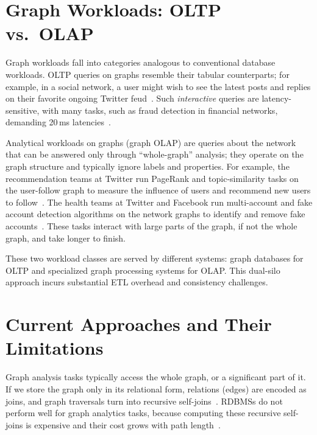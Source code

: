 \section{Graph Workloads: OLTP vs.\ OLAP}
\label{sec:intro:workloads}

Graph workloads fall into categories analogous to conventional database workloads.
\ac{OLTP} queries on graphs resemble their tabular counterparts; for example, in a social network, a user might wish to see the latest posts and replies on their favorite ongoing Twitter feud~\cite{AholeMusk:online}.
Such \emph{interactive} queries are latency-sensitive, with many tasks, such as fraud detection in financial networks, demanding 20\,ms latencies~\cite{qiu2018real}.

Analytical workloads on graphs (graph \ac{OLAP}) are queries about the network that can be answered only through ``whole-graph'' analysis; they operate on the graph structure and typically ignore labels and properties.
For example, the recommendation teams at Twitter run PageRank and topic-similarity tasks on the user-follow graph to measure the influence of users and recommend new users to follow~\cite{tang2022taming}.
The health teams at Twitter and Facebook run multi-account and fake account detection algorithms on the network graphs to identify and remove fake accounts~\cite{breuer2020friend}.
These tasks interact with large parts of the graph, if not the whole graph, and take longer to finish.

These two workload classes are served by different systems: graph databases for OLTP and specialized graph processing systems for OLAP.
This dual-silo approach incurs substantial \ac{ETL} overhead and consistency challenges.

\section{Current Approaches and Their Limitations}
\label{sec:intro:approaches}

Graph analysis tasks typically access the whole graph, or a significant part of it.
If we store the graph only in its relational form, relations (edges) are encoded as joins, and graph traversals turn into recursive self-joins~\cite{10.1145/3129246}.
RDBMSs do not perform well for graph analytics tasks, because computing these recursive self-joins is expensive and their cost grows with path length~\cite{TransitiveClosureBiskupStiefeling1989}.

